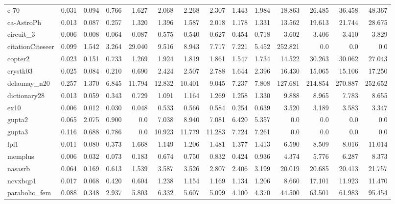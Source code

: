 \begin{sidewaystable}
{\begin{tabular}{ l r r r r r r r r r r r r r }
      c-70 & 0.031 & 0.094 & 0.766 & 1.627 & 2.068 & 2.268 & 2.307 & 1.443 & 1.984 & 18.863 & 26.485 & 36.458 & 48.367 \\
      ca-AstroPh & 0.013 & 0.087 & 0.257 & 1.320 & 1.396 & 1.587 & 2.018 & 1.178 & 1.331 & 13.562 & 19.613 & 21.744 & 28.675 \\
      circuit\_3 & 0.006 & 0.008 & 0.064 & 0.087 & 0.575 & 0.540 & 0.627 & 0.454 & 0.718 & 3.602 & 3.406 & 3.410 & 3.829 \\
      citationCiteseer & 0.099 & 1.542 & 3.264 & 29.040 & 9.516 & 8.943 & 7.717 & 7.221 & 5.452 & 252.821 & 0.0 & 0.0 & 0.0 \\
      copter2 & 0.023 & 0.151 & 0.733 & 1.269 & 1.924 & 1.819 & 1.861 & 1.547 & 1.734 & 14.522 & 30.263 & 30.062 & 27.043 \\
      crystk03 & 0.025 & 0.084 & 0.210 & 0.690 & 2.424 & 2.507 & 2.788 & 1.644 & 2.396 & 16.430 & 15.065 & 15.106 & 17.250 \\
      delaunay\_n20 & 0.257 & 1.370 & 6.845 & 11.794 & 12.832 & 10.401 & 9.045 & 7.237 & 7.808 & 127.681 & 214.854 & 270.887 & 252.652 \\
      dictionary28 & 0.013 & 0.059 & 0.343 & 0.729 & 1.091 & 1.164 & 1.269 & 1.258 & 1.330 & 9.888 & 8.965 & 7.783 & 8.655 \\
      ex10 & 0.006 & 0.012 & 0.030 & 0.048 & 0.533 & 0.566 & 0.584 & 0.254 & 0.639 & 3.520 & 3.189 & 3.583 & 3.347 \\
      gupta2 & 0.065 & 2.075 & 0.900 & 0.0 & 7.038 & 8.940 & 7.081 & 6.420 & 5.357 & 0.0 & 0.0 & 0.0 & 0.0 \\
      gupta3 & 0.116 & 0.688 & 0.786 & 0.0 & 10.923 & 11.779 & 11.283 & 7.724 & 7.261 & 0.0 & 0.0 & 0.0 & 0.0 \\
      lpl1 & 0.011 & 0.080 & 0.373 & 1.668 & 1.149 & 1.206 & 1.481 & 1.377 & 1.413 & 6.590 & 8.509 & 8.016 & 11.014 \\
      memplus & 0.006 & 0.032 & 0.073 & 0.183 & 0.674 & 0.750 & 0.832 & 0.424 & 0.936 & 4.374 & 5.776 & 6.287 & 8.373 \\
      nasasrb & 0.064 & 0.169 & 0.613 & 1.539 & 3.587 & 3.526 & 2.807 & 2.406 & 3.199 & 20.019 & 20.685 & 20.413 & 21.757 \\
      ncvxbqp1 & 0.017 & 0.068 & 0.420 & 0.604 & 1.238 & 1.154 & 1.169 & 1.134 & 1.206 & 8.660 & 17.101 & 11.923 & 11.470 \\
      parabolic\_fem & 0.088 & 0.348 & 2.937 & 5.803 & 6.332 & 5.607 & 5.099 & 4.100 & 4.370 & 44.500 & 63.501 & 61.983 & 95.454 \\

\end{tabular}}
\end{sidewaystable}
